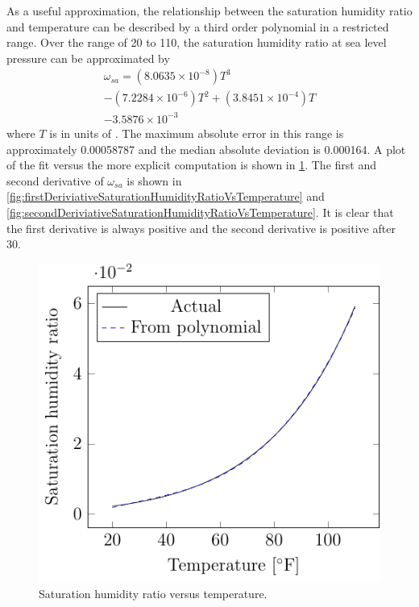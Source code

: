 As a useful approximation, the relationship between the saturation
humidity ratio and temperature can be described by a third order
polynomial in a restricted range. Over the range of \SI{20}{\degreeF} to
\SI{110}{\degreeF}, the saturation humidity ratio at sea level pressure
can be approximated by
\begin{multline}
    \omega_{sa} = \left(8.0635 \times 10^{-8}\right) T^3 \\ 
    - \left(7.2284 \times 10^{-6}\right)  T^2 + \left(3.8451\times 10^{-4}\right) T \\
    -  3.5876\times 10^{-3}
\end{multline}
where \(T\) is in units of \si{\degreeF}. The maximum absolute error in
this range is approximately \num[group-separator={ }]{0.00058787} and the median absolute
deviation is \num[group-separator={ }]{0.000164}. A plot of the fit
versus the more explicit computation is shown in \figref{}
\ref{fig:saturationHumidityRatioVsTemperature}. The first and second
derivative of \(\omega_{sa}\) is shown in \figref{}
\ref{fig:firstDeriviativeSaturationHumidityRatioVsTemperature} and
\figref{}
\ref{fig:secondDeriviativeSaturationHumidityRatioVsTemperature}. It is
clear that the first derivative is always positive and the second
derivative is positive after \SI{30}{\degreeF}.

\begin{figure}
\centering
\includegraphics{Plots/44-SaturatedHumidityVsTemperature/saturationHumidityVsTemperature.pdf}
\caption{Saturation humidity ratio versus temperature.}
\label{fig:saturationHumidityRatioVsTemperature}
\end{figure}


